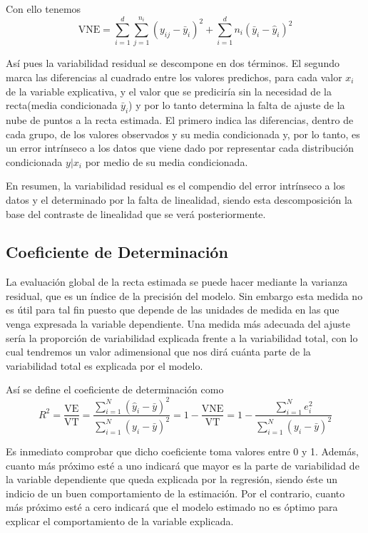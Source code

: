 \documentclass[10pt,a4paper]{book}
\begin{document}
Con ello tenemos $$\mathrm{VNE}=\sum^d_{i=1}\sum^{n_i}_{j=1}(y_{ij}-\bar{y}_i)^2+\sum^d_{i=1}n_i(\bar{y}_i-\widehat{y}_i)^2$$

Así pues la variabilidad residual se descompone en dos términos. El segundo marca las diferencias al cuadrado entre los valores predichos, para cada valor $x_i$ de la variable explicativa, y el valor que se prediciría sin la necesidad de la recta(media condicionada $\bar{y}_i$) y por lo tanto determina la falta de ajuste de la nube de puntos a la recta estimada. El primero indica las diferencias, dentro de cada grupo, de los valores observados y su media condicionada y, por lo tanto, es un error intrínseco a los datos que viene dado por representar cada distribución condicionada $y | x_i$ por medio de su media condicionada.

En resumen, la variabilidad residual es el compendio del error intrínseco a los datos y el determinado por la falta de linealidad, siendo esta descomposición la base del contraste de linealidad que se verá posteriormente.
		\subsection{Coeficiente de Determinación}
La evaluación global de la recta estimada se puede hacer mediante la varianza residual, que es un índice de la precisión del modelo. Sin embargo esta medida no es útil para tal fin puesto que depende de las unidades de medida en las que venga expresada la variable dependiente. Una medida más adecuada del
ajuste sería la proporción de variabilidad explicada frente a la variabilidad total, con lo cual tendremos un valor adimensional que nos dirá cuánta parte de la variabilidad total es explicada por el modelo.

Así se define el coeficiente de determinación como $$R^2=\dfrac{\mathrm{VE}}{\mathrm{VT}}=\dfrac{\displaystyle\sum^N_{i=1}(\widehat{y}_i-\bar{y})^2}{\displaystyle\sum^N_{i=1}(y_i-\bar{y})^2}=1-\dfrac{\mathrm{VNE}}{\mathrm{VT}}=1-\dfrac{\displaystyle\sum^N_{i=1}e^2_i}{\displaystyle\sum^N_{i=1}(y_i-\bar{y})^2}$$

Es inmediato comprobar que dicho coeficiente toma valores entre 0 y 1. Además, cuanto más próximo esté a uno indicará que mayor es la parte de variabilidad de la variable dependiente que queda explicada por la regresión, siendo éste un indicio de un buen comportamiento de la estimación. Por el contrario, cuanto más próximo esté a cero indicará que el modelo estimado no es óptimo para explicar el comportamiento de la variable explicada.
\end{document}
